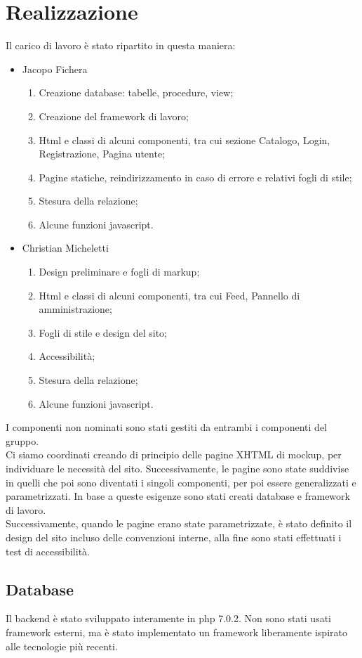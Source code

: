 \documentclass[12pt, a4paper]{article}
\begin{document}
\section{Realizzazione}
Il carico di lavoro è stato ripartito in questa maniera:
\begin{itemize}
\item Jacopo Fichera
\begin{enumerate}
	\item Creazione database: tabelle, procedure, view;
	\item Creazione del framework di lavoro;
	\item Html e classi di alcuni componenti, tra cui sezione Catalogo, Login, Registrazione, Pagina utente;
	\item Pagine statiche, reindirizzamento in caso di errore e relativi fogli di stile;
	\item Stesura della relazione;
	\item Alcune funzioni javascript.
\end{enumerate}
\item Christian Micheletti
\begin{enumerate}
	\item Design preliminare e fogli di markup; 
	\item Html e classi di alcuni componenti, tra cui Feed, Pannello di amministrazione;
	\item Fogli di stile e design del sito;
	\item Accessibilità;
	\item Stesura della relazione;
	\item Alcune funzioni javascript.
\end{enumerate}
\end{itemize}
I componenti non nominati sono stati gestiti da entrambi i componenti del gruppo. \\
Ci siamo coordinati creando di principio delle pagine XHTML di mockup, per individuare le necessità del sito. Successivamente, le pagine sono state suddivise in quelli che poi sono diventati i singoli componenti, per poi essere generalizzati e parametrizzati. In base a queste esigenze sono stati creati database e framework di lavoro. \\
Successivamente, quando le pagine erano state parametrizzate, è stato definito il design del sito incluso delle convenzioni interne, alla fine sono stati effettuati i test di accessibilità.

\subsection{Database}
Il backend è stato sviluppato interamente in php 7.0.2. Non sono stati usati framework esterni, ma è stato implementato un framework liberamente ispirato alle tecnologie più recenti. 
\end{document}
